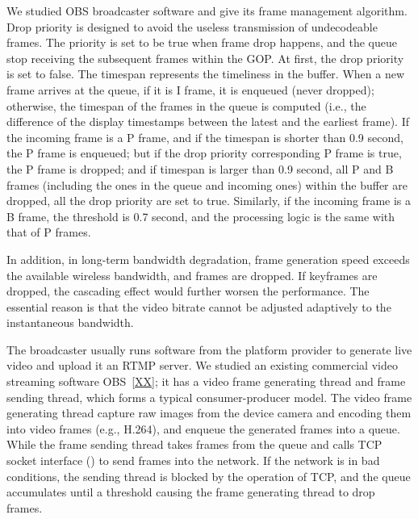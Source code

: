 We studied OBS broadcaster software and give its frame management algorithm. Drop priority is designed to avoid the useless transmission of undecodeable frames. The priority is set to be true when frame drop happens, and the queue stop receiving the subsequent frames within the GOP. At first, the drop priority is set to false. The timespan represents the timeliness in the buffer. When a new frame arrives at the queue, if it is I frame, it is enqueued (never dropped); otherwise, the timespan of the frames in the queue is computed (i.e., the difference of the display timestamps between the latest and the earliest frame). If the incoming frame is a P frame, and if the timespan is shorter than 0.9 second, the P frame is enqueued; but if the drop priority corresponding P frame is true, the P frame is dropped; and if timespan is larger than 0.9 second, all P and B frames (including the ones in the queue and incoming ones) within the buffer are dropped, all the drop priority are set to true. Similarly, if the incoming frame is a B frame, the threshold is 0.7 second, and the processing logic is the same with that of P frames.

In addition, in long-term bandwidth degradation, frame generation speed exceeds the available wireless bandwidth, and frames are dropped. If keyframes are dropped, the cascading effect would further worsen the performance. The essential reason is that the video bitrate cannot be adjusted adaptively to the instantaneous bandwidth.

\iffalse

The broadcaster usually runs software from the platform provider to generate live video and upload it an RTMP server. We studied an existing commercial video streaming software OBS~\ref{XX}; it has a video frame generating thread and frame sending thread, which forms a typical consumer-producer model. The video frame generating thread capture raw images from the device camera and encoding them into video frames (e.g., H.264), and enqueue the generated frames into a queue. While the frame sending thread takes frames from the queue and calls TCP socket interface (\mywrite) to send frames into the network. If the network is in bad conditions, the sending thread is blocked by the \mywrite operation of TCP, and the queue accumulates until a threshold causing the frame generating thread to drop frames.


